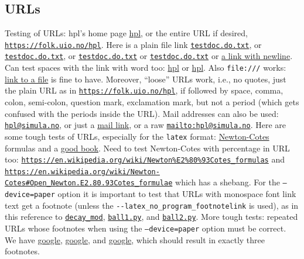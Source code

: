 \documentclass[%
oneside,                 %
final,                   %
10pt]{article}
\theoremstyle{definition}
\begin{document}
\begin{enumerate}
\subsection{URLs}
\label{subsubsec:ex}
Testing of URLs: hpl's home page \href{{https://folk.uio.no/hpl}}{hpl}, or
the entire URL if desired, \href{{https://folk.uio.no/hpl}}{\nolinkurl{https://folk.uio.no/hpl}}.  Here is a
plain file link \href{{testdoc.do.txt}}{\nolinkurl{testdoc.do.txt}}, or \href{{testdoc.do.txt}}{\nolinkurl{testdoc.do.txt}}, or
\href{{testdoc.do.txt}}{\nolinkurl{testdoc.do.txt}} or \href{{testdoc.do.txt}}{\nolinkurl{testdoc.do.txt}} or \href{{testdoc.do.txt}}{a link with
newline}. Can test spaces with the link with word
too: \href{{https://folk.uio.no/hpl}}{hpl} or \href{{https://folk.uio.no/hpl}}{hpl}. Also \texttt{file:///} works: \href{{file:///home/hpl/vc/doconce/doc/demos/manual/manual.html}}{link to a
file} is
fine to have. Moreover, ``loose'' URLs work, i.e., no quotes, just
the plain URL as in \href{{https://folk.uio.no/hpl}}{\nolinkurl{https://folk.uio.no/hpl}}, if followed by space, comma,
colon, semi-colon, question mark, exclamation mark, but not a period
(which gets confused with the periods inside the URL).
Mail addresses can also be used: \href{{mailto:hpl@simula.no}}{\nolinkurl{hpl@simula.no}}, or just a \href{{mailto:hpl@simula.no}}{mail link}, or a raw \href{{mailto:hpl@simula.no}}{\nolinkurl{mailto:hpl@simula.no}}.
Here are some tough tests of URLs, especially for the \texttt{latex} format:
\href{{https://en.wikipedia.org/wiki/Newton%E2%80%93Cotes_formulas}}{Newton-Cotes} formulas
and a \href{{https://www.springer.com/mathematics/computational+science+%26+engineering/book/978-3-642-23098-1}}{good book}. Need to test
Newton-Cotes with percentage in URL too:
\href{{https://en.wikipedia.org/wiki/Newton%E2%80%93Cotes_formulas}}{\nolinkurl{https://en.wikipedia.org/wiki/Newton\%E2\%80\%93Cotes_formulas}}
and \href{{https://en.wikipedia.org/wiki/Newton-Cotes#Open_Newton.E2.80.93Cotes_formulae}}{\nolinkurl{https://en.wikipedia.org/wiki/Newton-Cotes\#Open_Newton.E2.80.93Cotes_formulae}} which has a shebang.
For the \texttt{--device=paper} option it is important to test that URLs with
monospace font link text get a footnote
(unless the \Verb!--latex_no_program_footnotelink!
is used), as in this reference to
\href{{https://github.com/hplgit/INF5620/tree/gh-pages/src/decay/experiments/decay_mod.py}}{\nolinkurl{decay_mod}}, \href{{https://tinyurl.com/pwyasaa/formulas.ball1.py}}{\nolinkurl{ball1.py}},
and \href{{https://tinyurl.com/pwyasaa/formulas.ball2.py}}{\nolinkurl{ball2.py}}.
More tough tests: repeated URLs whose footnotes when using the
\texttt{--device=paper} option must be correct. We have
\href{{https://google.com}}{google}, \href{{https://google.com}}{google}, and
\href{{https://google.com}}{google}, which should result in exactly three
footnotes.

\end{enumerate}
\end{document}
